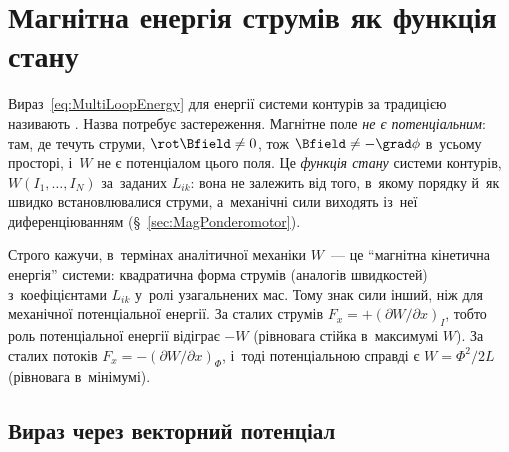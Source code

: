 \section{Магнітна енергія струмів як функція стану}\label{sec:CurrentPotentialEnergy}\hypertarget{current-potential-energy}{}

Вираз~\eqref{eq:MultiLoopEnergy} для енергії системи контурів за традицією називають . Назва потребує застереження. Магнітне поле \emph{не є потенціальним}: там, де течуть струми, $\rot\Bfield\neq0$, тож $\Bfield\neq-\grad\phi$ в~усьому просторі, і~$W$ не є потенціалом цього поля. Це \emph{функція стану} системи контурів, $W(I_1,\dots,I_N)$ за~заданих $L_{ik}$: вона не залежить від того, в~якому порядку й~як швидко встановлювалися струми, а~механічні сили виходять із~неї диференціюванням (\S~\ref{sec:MagPonderomotor}).

Строго кажучи, в~термінах аналітичної механіки $W$~--- це \enquote{магнітна кінетична енергія} системи: квадратична форма струмів (аналогів швидкостей) з~коефіцієнтами $L_{ik}$ у~ролі узагальнених мас. Тому знак сили інший, ніж для механічної потенціальної енергії. За сталих струмів $F_x=+(\partial W/\partial x)_I$, тобто роль потенціальної енергії відіграє $-W$ (рівновага стійка в~максимумі $W$). За сталих потоків $F_x=-(\partial W/\partial x)_\Phi$, і~тоді потенціальною справді є $W=\Phi^2/2L$ (рівновага в~мінімумі).



\subsection*{Вираз через векторний потенціал}



